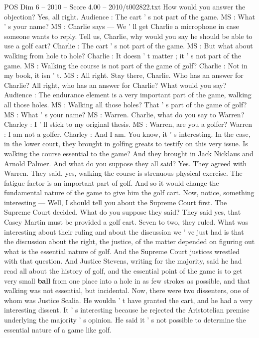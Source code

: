 \begin{textsample}{POS Dim 6 – 2010 – Score 4.00 – 2010/t002822.txt}
How would you answer the objection?
Yes, all right.
Audience : The cart ' s not part of the game.
MS : What ' s your name?
MS : Charlie says — We ' ll get Charlie a microphone in case someone wants to reply.
Tell us, Charlie, why would you say he should be able to use a golf cart?
Charlie : The cart ' s not part of the game.
MS : But what about walking from hole to hole?
Charlie : It doesn ' t matter ; it ' s not part of the game.
MS : Walking the course is not part of the game of golf?
Charlie : Not in my book, it isn ' t.
MS : All right.
Stay there, Charlie.
Who has an answer for Charlie?
All right, who has an answer for Charlie?
What would you say?
Audience : The endurance element is a very important part of the game, walking all those holes.
MS : Walking all those holes?
That ' s part of the game of golf?
MS : What ' s your name?
MS : Warren.
Charlie, what do you say to Warren?
Charley : I ' ll stick to my original thesis.
MS : Warren, are you a golfer?
Warren : I am not a golfer.
Charley : And I am.
You know, it ' s interesting.
In the case, in the lower court, they brought in golfing greats to testify on this very issue.
Is walking the course essential to the game?
And they brought in Jack Nicklaus and Arnold Palmer.
And what do you suppose they all said?
Yes.
They agreed with Warren.
They said, yes, walking the course is strenuous physical exercise.
The fatigue factor is an important part of golf.
And so it would change the fundamental nature of the game to give him the golf cart.
Now, notice, something interesting — Well, I should tell you about the Supreme Court first.
The Supreme Court decided.
What do you suppose they said?
They said yes, that Casey Martin must be provided a golf cart.
Seven to two, they ruled.
What was interesting about their ruling and about the discussion we ' ve just had is that the discussion about the right, the justice, of the matter depended on figuring out what is the essential nature of golf.
And the Supreme Court justices wrestled with that question.
And Justice Stevens, writing for the majority, said he had read all about the history of golf, and the essential point of the game is to get very small \textbf{ball} from one place into a hole in as few strokes as possible, and that walking was not essential, but incidental.
Now, there were two dissenters, one of whom was Justice Scalia.
He wouldn ' t have granted the cart, and he had a very interesting dissent.
It ' s interesting because he rejected the Aristotelian premise underlying the majority ' s opinion.
He said it ' s not possible to determine the essential nature of a game like golf.

\end{textsample}
